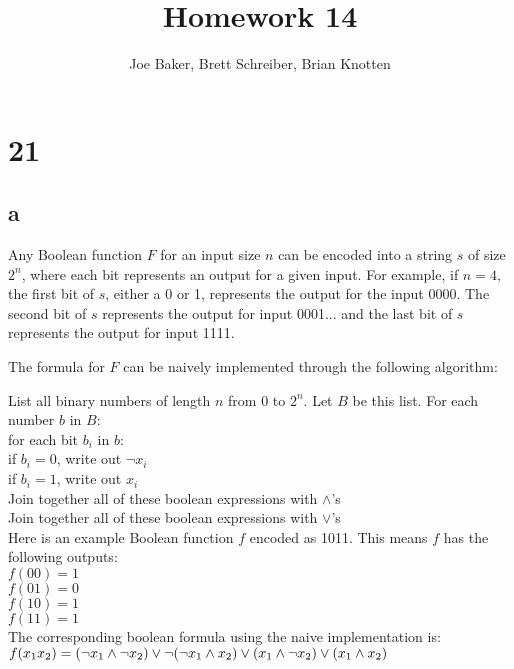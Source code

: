\documentclass[letterpaper,notitlepage,twoside]{article}
\newcommand\tab[1][1cm]{\hspace*{#1}} %
\begin{document}
\title{Homework 14}
\author{Joe Baker, Brett Schreiber, Brian Knotten}
\maketitle

\section*{21}

\subsection*{a}
Any Boolean function $F$ for an input size $n$ can be encoded into a string $s$ of size $2^n$, where each bit represents an output for a given input. For example, if $n = 4$, the first bit of $s$, either a 0 or 1, represents the output for the input 0000. The second bit of $s$ represents the output for input 0001... and the last bit of $s$ represents the output for input 1111.

The formula for $F$ can be naively implemented through the following algorithm:

List all binary numbers of length $n$ from $0$ to $2^n$. Let $B$ be this list.
For each number $b$ in $B$: \\
\tab for each bit $b_i$ in $b$: \\
\tab\tab if $b_i = 0$, write out $\neg x_i$ \\
\tab\tab if $b_i = 1$, write out $x_i$ \\
\tab Join together all of these boolean expressions with $\land$'s \\
Join together all of these boolean expressions with $\lor$'s \\

Here is an example Boolean function $f$ encoded as 1011. This means $f$ has the following outputs: \\
$f(00) = 1$ \\
$f(01) = 0$ \\
$f(10) = 1$ \\
$f(11) = 1$ \\

The corresponding boolean formula using the naive implementation is:
$f(x_1x_2) = (\neg x_1 \land \neg x_2) \lor \\
\neg(\neg x_1 \land x_2) \lor \\
(x_1 \land \neg x_2) \lor \\
(x_1 \land x_2)$ \\
\end{document}
